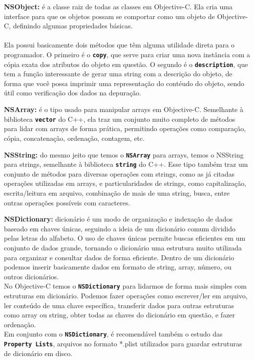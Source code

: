 \documentclass[a4paper,12pt,brazil,doubleside]{book}
\begin{document}
\begin{description}
\item{\textbf{NSObject:} é a classe raiz de todas as classes em Objective-C. Ela cria uma interface para que os objetos possam se comportar como um objeto de Objective-C, definindo algumas propriedades básicas.
\paragraph{}Ela possui basicamente dois métodos que têm alguma utilidade direta para o programador. O primeiro é o \texttt{\textbf{copy}}, que serve para criar uma nova instância com a cópia exata dos atributos do objeto em questão. O segundo é o \texttt{\textbf{description}}, que tem a função interessante de gerar uma string com a descrição do objeto, de forma que você possa imprimir uma representação do contéudo do objeto, sendo útil como verificação dos dados na depuração.}

\item{\textbf{NSArray:} é o tipo usado para manipular arrays em Objective-C. Semelhante à biblioteca \texttt{\textbf{vector}} do C++, ela traz um conjunto muito completo de métodos para lidar com arrays de forma prática, permitindo operações como comparação, cópia, concatenação, ordenação, contagem, etc.}

\item{\textbf{NSString:} do mesmo jeito que temos o \texttt{\textbf{NSArray}} para arrays, temos o NSString para strings, semelhante à biblioteca \texttt{\textbf{string}} do C++. Esse tipo também traz um conjunto de métodos para diversas operações com strings, como as já citadas operações utilizadas em arrays, e particularidades de strings, como capitalização, escrita/leitura em arquivo, combinação de mais de uma string, busca, entre outras operações possíveis com caracteres.}

\item{\textbf{NSDictionary:} dicionário é um modo de organização e indexação de dados baseado em chaves únicas, seguindo a ideia de um dicionário comum dividido pelas letras do alfabeto. O uso de chaves únicas permite buscas eficientes em um conjunto de dados grande, tornando o dicionário uma estrutura muito utilizada para organizar e consultar dados de forma eficiente. Dentro de um dicionário podemos inserir basicamente dados em formato de string, array, número, ou outros dicionários.\\
No Objective-C temos o \texttt{\textbf{NSDictionary}} para lidarmos de forma mais simples com estruturas em dicionário. Podemos fazer operações como escrever/ler em arquivo, ler conteúdo de uma chave específica, transferir dados para outras estruturas como array ou string, obter todas as chaves do dicionário em questão, e fazer ordenação.\\
Em conjunto com o \texttt{\textbf{NSDictionary}}, é recomendável também o estudo das \texttt{\textbf{Property Lists}}, arquivos no formato *.plist utilizados para guardar estruturas de dicionário em disco.}


\end{description}
\end{document}
